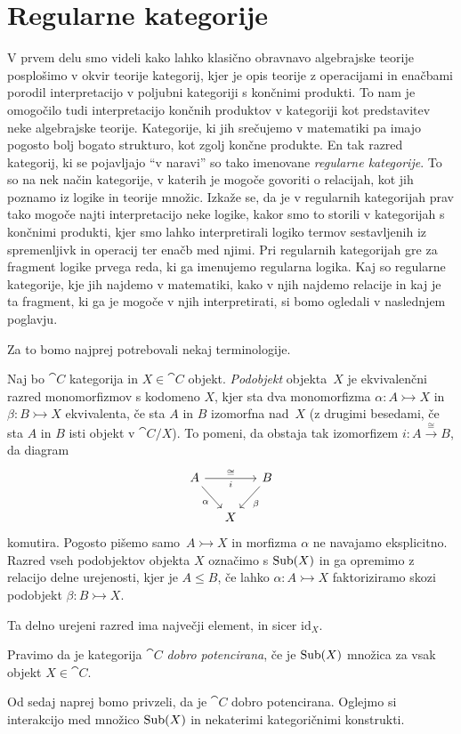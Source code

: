 \documentclass[../kategoricna_logika.tex]{subfiles}
\begin{document}
\section{Regularne kategorije}
V prvem delu smo videli kako lahko klasično obravnavo algebrajske
teorije posplošimo v okvir teorije kategorij, kjer je opis teorije z
operacijami in enačbami porodil interpretacijo v poljubni kategoriji s
končnimi produkti. To nam je omogočilo tudi interpretacijo končnih
produktov v kategoriji kot predstavitev neke algebrajske
teorije. Kategorije, ki jih srečujemo v matematiki pa imajo pogosto
bolj bogato strukturo, kot zgolj končne produkte. En tak razred
kategorij, ki se pojavljajo ``v naravi'' so tako imenovane
\emph{regularne kategorije}.  To so na nek način kategorije, v katerih
je mogoče govoriti o relacijah, kot jih poznamo iz logike in teorije
množic.  Izkaže se, da je v regularnih kategorijah prav tako mogoče
najti interpretacijo neke logike, kakor smo to storili v kategorijah s
končnimi produkti, kjer smo lahko interpretirali logiko termov
sestavljenih iz spremenljivk in operacij ter enačb med njimi.  Pri
regularnih kategorijah gre za fragment logike prvega reda, ki ga
imenujemo regularna logika.  Kaj so regularne kategorije, kje jih
najdemo v matematiki, kako v njih najdemo relacije in kaj je ta
fragment, ki ga je mogoče v njih interpretirati, si bomo ogledali v
naslednjem poglavju.

Za to bomo najprej potrebovali nekaj terminologije.
\begin{definicija}
  Naj bo $\cat{C}$ kategorija in $X \in \cat{C}$ objekt.
  \emph{Podobjekt} objekta~$X$ je ekvivalenčni razred monomorfizmov s
  kodomeno $X$, kjer sta dva monomorfizma
  $\alpha: A \rightarrowtail X$ in $\beta : B \rightarrowtail X$
  ekvivalenta, če sta $A$ in $B$ izomorfna nad~$X$ (z drugimi
  besedami, če sta $A$ in $B$ isti objekt v $\cat{C}/X$).  To pomeni,
  da obstaja tak izomorfizem $i : A \xrightarrow{\cong} B$, da diagram
  \begin{equation*}
    \begin{tikzcd}[column sep=small]
      A \ar[rr, "i"']{a}{\cong} \ar[dr, "\alpha"'] & & B \ar[dl, "\beta"] \\
      & X &
    \end{tikzcd}
  \end{equation*}
  komutira. Pogosto pišemo samo~${A \rightarrowtail X}$ in morfizma
  $\alpha$ ne navajamo eksplicitno.  Razred vseh podobjektov objekta
  $X$ označimo s $\operatorname{Sub}(X)$ in ga opremimo z relacijo delne urejenosti,
  kjer je $A \leq B$, če lahko $\alpha : A \rightarrowtail X$
  faktoriziramo skozi podobjekt $\beta : B \rightarrowtail X$.
\end{definicija}
Ta delno urejeni razred ima največji element, in sicer
$\mathrm{id}_X$.
\begin{definicija}
  Pravimo da je kategorija $\cat{C}$ \emph{dobro potencirana}, če je
  $\operatorname{Sub}(X)$ množica za vsak objekt $X \in \cat{C}$.
\end{definicija}
Od sedaj naprej bomo privzeli, da je $\cat{C}$ dobro potencirana.
Oglejmo si interakcijo med množico $\operatorname{Sub}(X)$ in nekaterimi
kategoričnimi konstrukti.
\end{document}
